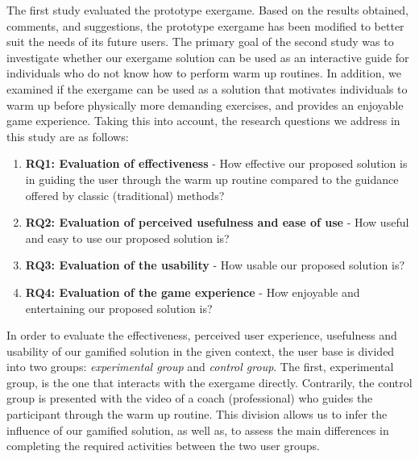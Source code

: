 The first study evaluated the prototype exergame. Based on the results obtained, comments, and suggestions, the prototype exergame has been modified to better suit the needs of its future users. The primary goal of the second study was to investigate whether our exergame solution can be used as an interactive guide for individuals who do not know how to perform warm up routines. In addition, we examined if the exergame can be used as a solution that motivates individuals to warm up before physically more demanding exercises, and provides an enjoyable game experience. Taking this into account, the research questions we address in this study are as follows: 
\begin{enumerate}
\item \textbf{RQ1: Evaluation of effectiveness} - How effective our proposed solution is in guiding the user through the warm up routine compared to the guidance offered by classic (traditional) methods?
\item \textbf{RQ2: Evaluation of perceived usefulness and ease of use} - How useful and easy to use our proposed solution is?
\item \textbf{RQ3: Evaluation of the usability} - How usable our proposed solution is? 
\item \textbf{RQ4: Evaluation of the game experience} - How enjoyable and entertaining our proposed solution is? 
\end{enumerate}
In order to evaluate the effectiveness, perceived user experience, usefulness and usability of our gamified solution in the given context, the user base is divided into two groups: \textit{experimental group} and \textit{control group}. The first, experimental group, is the one that interacts with the exergame directly. Contrarily, the control group is presented with the video of a coach (professional) who guides the participant through the warm up routine. This division allows us to infer the influence of our gamified solution, as well as, to assess the main differences in completing the required activities between the two user groups. 
